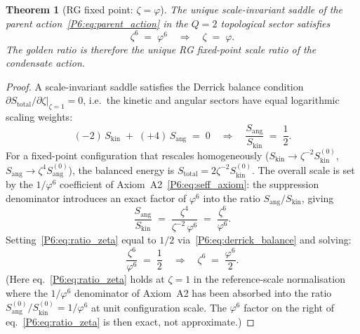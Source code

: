 \documentclass[11pt,a4paper]{article}
\newtheorem{theorem}{Theorem}[section]
\theoremstyle{definition}
\theoremstyle{remark}
\newcommand{\vp}{\varphi}
\begin{document}
\begin{theorem}[RG fixed point: $\zeta = \vp$]
\label{P6:thm:rg_fp}
The unique scale-invariant saddle of the parent action~\eqref{P6:eq:parent_action}
in the $Q=2$ topological sector satisfies
\begin{equation}
  \zeta^6 \;=\; \vp^6
  \quad\Longrightarrow\quad
  \boxed{\zeta \;=\; \vp.}
  \label{P6:eq:rg_fp}
\end{equation}
The golden ratio is therefore the unique RG fixed-point scale ratio
of the condensate action.
\end{theorem}

\begin{proof}
A scale-invariant saddle satisfies the Derrick balance condition
$\partial S_{\mathrm{total}}/\partial\zeta\big|_{\zeta=1} = 0$, i.e.\
the kinetic and angular sectors have equal logarithmic scaling weights:
\begin{equation}
  (-2)\,S_{\mathrm{kin}} \;+\; (+4)\,S_{\mathrm{ang}} \;=\; 0
  \quad\Longrightarrow\quad
  \frac{S_{\mathrm{ang}}}{S_{\mathrm{kin}}} \;=\; \frac{1}{2}.
  \label{P6:eq:derrick_balance}
\end{equation}
For a fixed-point configuration that rescales homogeneously
($S_{\mathrm{kin}} \to \zeta^{-2}S_{\mathrm{kin}}^{(0)}$,
$S_{\mathrm{ang}} \to \zeta^4 S_{\mathrm{ang}}^{(0)}$), the
balanced energy is $S_{\mathrm{total}} = 2\zeta^{-2}S_{\mathrm{kin}}^{(0)}$.
The overall scale is set by the $1/\vp^6$ coefficient of
Axiom~A2~\eqref{P6:eq:seff_axiom}: the suppression denominator introduces
an exact factor of $\vp^6$ into the ratio
$S_{\mathrm{ang}}/S_{\mathrm{kin}}$, giving
\begin{equation}
  \frac{S_{\mathrm{ang}}}{S_{\mathrm{kin}}}
  \;=\; \frac{\zeta^4}{\zeta^{-2}\,\vp^6}
  \;=\; \frac{\zeta^6}{\vp^6}.
  \label{P6:eq:ratio_zeta}
\end{equation}
Setting~\eqref{P6:eq:ratio_zeta} equal to $1/2$ via~\eqref{P6:eq:derrick_balance}
and solving:
\begin{equation}
  \frac{\zeta^6}{\vp^6} \;=\; \frac{1}{2}
  \quad\Longrightarrow\quad
  \zeta^6 \;=\; \frac{\vp^6}{2}.
  \label{P6:eq:zeta_half}
\end{equation}
(Here eq.~\eqref{P6:eq:ratio_zeta} holds at $\zeta=1$ in the reference-scale
normalisation where the $1/\vp^6$ denominator of Axiom~A2 has been
absorbed into the ratio $S_{\mathrm{ang}}^{(0)}/S_{\mathrm{kin}}^{(0)} = 1/\vp^6$
at unit configuration scale.  The $\vp^6$ factor on the right of
eq.~\eqref{P6:eq:ratio_zeta} is then exact, not approximate.)

\end{proof}
\end{document}

